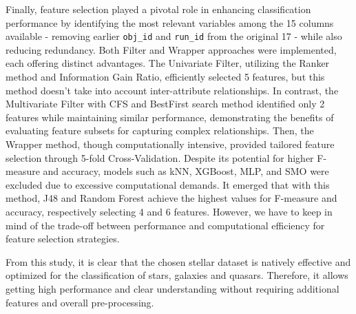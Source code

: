 Finally, feature selection played a pivotal role in enhancing classification performance by identifying the most relevant variables among the 15 columns available - removing earlier \texttt{obj\_id} and \texttt{run\_id} from the original 17 - while also reducing redundancy. Both Filter and Wrapper approaches were implemented, each offering distinct advantages. The Univariate Filter, utilizing the Ranker method and Information Gain Ratio, efficiently selected 5 features, but this method doesn't take into account inter-attribute relationships. In contrast, the Multivariate Filter with CFS and BestFirst search method identified only 2 features while maintaining similar performance, demonstrating the benefits of evaluating feature subsets for capturing complex relationships. Then, the Wrapper method, though computationally intensive, provided tailored feature selection through 5-fold Cross-Validation. Despite its potential for higher F-measure and accuracy, models such as kNN, XGBoost, MLP, and SMO were excluded due to excessive computational demands. It emerged that with this method, J48 and Random Forest achieve the highest values for F-measure and accuracy, respectively selecting 4 and 6 features. However, we have to keep in mind of the trade-off between performance and computational efficiency for feature selection strategies.

From this study, it is clear that the chosen stellar dataset is natively effective and optimized for the classification of stars, galaxies and quasars. Therefore, it allows getting high performance and clear understanding without requiring additional features and overall pre-processing. 

